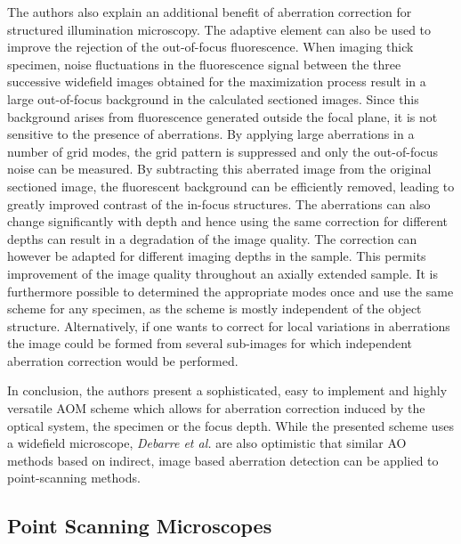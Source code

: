 The authors also explain an additional benefit of aberration correction for structured illumination microscopy. The adaptive element can also be used to improve the rejection of the out-of-focus fluorescence. When imaging thick specimen, noise fluctuations in the fluorescence signal between the three successive widefield images obtained for the maximization process result in a large out-of-focus background in the calculated sectioned images. Since this background arises from fluorescence generated outside the focal plane, it is not sensitive to the presence of aberrations. By applying large aberrations in a number of grid modes, the grid pattern is suppressed and only the out-of-focus noise can be measured. By subtracting this aberrated image from the original sectioned image, the fluorescent background can be efficiently removed, leading to greatly improved contrast of the in-focus structures. The aberrations can also change significantly with depth and hence using the same correction for different depths can result in a degradation of the image quality.  The correction can however be adapted for different imaging depths in the sample. This permits improvement of the image quality throughout an axially extended sample. It is furthermore possible to determined the appropriate modes once and use the same scheme for any specimen, as the scheme is mostly independent of the object structure. Alternatively, if one wants to correct for local variations in aberrations the image could be formed from several sub-images for which independent aberration correction would be performed.

In conclusion, the authors present a sophisticated, easy to implement and highly versatile AOM scheme which allows for aberration correction induced by the optical system, the specimen or the focus depth. While the presented scheme uses a widefield microscope, \emph{Debarre et al.} are also optimistic that similar AO methods based on indirect, image based aberration detection can be applied to point-scanning methods. 

\subsection{Point Scanning Microscopes}
\label{sec:PointScanningMicroscopes}


